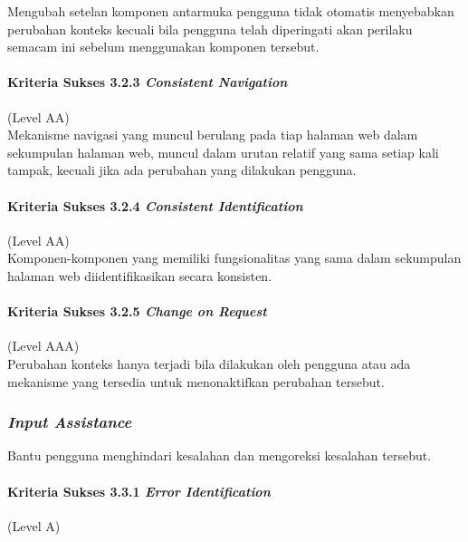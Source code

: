 Mengubah setelan komponen antarmuka pengguna tidak otomatis menyebabkan perubahan konteks kecuali bila pengguna telah diperingati akan perilaku semacam ini sebelum menggunakan komponen tersebut.

\paragraph{Kriteria Sukses 3.2.3 \textit{Consistent Navigation}}
\label{sec:kriteria_sukses_3.2.3}
(Level AA)\\

Mekanisme navigasi yang muncul berulang pada tiap halaman web dalam sekumpulan halaman web, muncul dalam urutan relatif yang sama setiap kali tampak, kecuali jika ada perubahan yang dilakukan pengguna.

\paragraph{Kriteria Sukses 3.2.4 \textit{Consistent Identification}}
\label{sec:kriteria_sukses_3.2.4}
(Level AA)\\

Komponen-komponen yang memiliki fungsionalitas yang sama dalam sekumpulan halaman web diidentifikasikan secara konsisten.

\paragraph{Kriteria Sukses 3.2.5 \textit{Change on Request}}
\label{sec:kriteria_sukses_3.2.5}
(Level AAA)\\

Perubahan konteks hanya terjadi bila dilakukan oleh pengguna atau ada mekanisme yang tersedia untuk menonaktifkan perubahan tersebut.

\subsubsection{\textit{Input Assistance}}
\label{sec:input_assistance}
Bantu pengguna menghindari kesalahan dan mengoreksi kesalahan tersebut.

\paragraph{Kriteria Sukses 3.3.1 \textit{Error Identification}}
\label{sec:kriteria_sukses_3.3.1}
(Level A)\\

